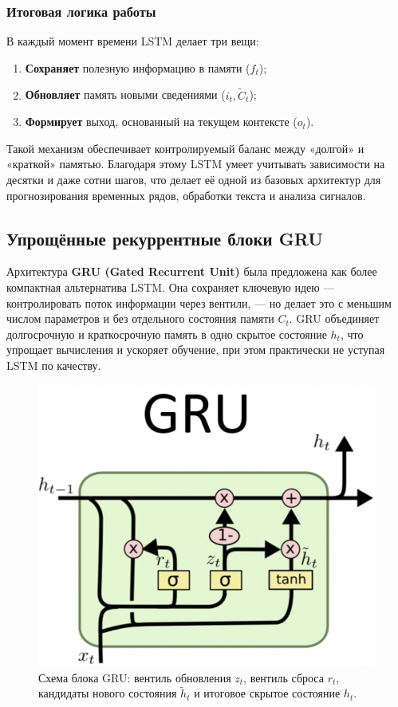 \documentclass[12pt,a4paper]{article}
\begin{document}
\subsubsection*{Итоговая логика работы}
В каждый момент времени LSTM делает три вещи:
\begin{enumerate}
  \item \textbf{Сохраняет} полезную информацию в памяти (\(f_t\));
  \item \textbf{Обновляет} память новыми сведениями (\(i_t, \tilde{C}_t\));
  \item \textbf{Формирует} выход, основанный на текущем контексте (\(o_t\)).
\end{enumerate}

Такой механизм обеспечивает контролируемый баланс между «долгой» и «краткой» памятью.
Благодаря этому LSTM умеет учитывать зависимости на десятки и даже сотни шагов, что делает её одной из базовых архитектур для прогнозирования временных рядов, обработки текста и анализа сигналов.






\subsection{Упрощённые рекуррентные блоки GRU}

Архитектура \textbf{GRU (Gated Recurrent Unit)} была предложена как более компактная альтернатива LSTM.
Она сохраняет ключевую идею — контролировать поток информации через вентили, — но делает это с меньшим числом параметров и без отдельного состояния памяти \( C_t \).
GRU объединяет долгосрочную и краткосрочную память в одно скрытое состояние \( h_t \), что упрощает вычисления и ускоряет обучение, при этом практически не уступая LSTM по качеству.

\begin{figure}[h]
  \centering
  \includegraphics[width=0.5\linewidth]{GRU.png}
  \caption{Схема блока GRU: вентиль обновления $z_t$, вентиль сброса $r_t$, кандидаты нового состояния $\tilde{h}_t$ и итоговое скрытое состояние $h_t$.}
\end{figure}
\end{document}
